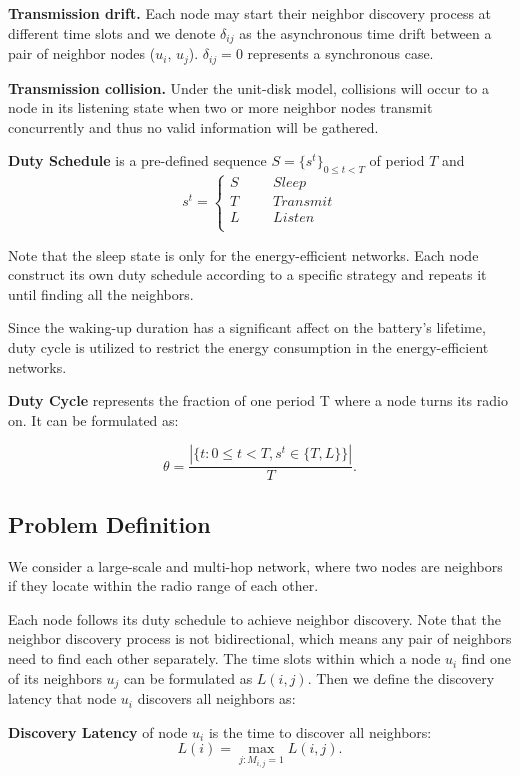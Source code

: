 \textbf{Transmission drift.} 
Each node may start their neighbor discovery process 
at different time slots and we denote $\delta_{ij}$ as the asynchronous time drift
between a pair of neighbor nodes ($u_i$, $u_j$). 
$\delta_{ij} = 0$ represents a synchronous case.
   

\textbf{Transmission collision.} 
Under the unit-disk model, collisions will occur 
to a node in its listening state when two or more neighbor nodes 
transmit concurrently and thus no valid information will be gathered.

\begin{definition}
\textbf{Duty Schedule} is a pre-defined sequence $S=\{s^t\}_{0\leq t<T}$ of period $T$ and
$$ s^t=\left\{
\begin{aligned}
S  & & & {Sleep}  	 \\
T  & & & {Transmit}	\\
L  & & & {Listen}	\\
\end{aligned}
\right.
$$
\end{definition}

Note that the sleep state is only for the energy-efficient networks.
Each node construct its own duty schedule according to a specific strategy and repeats it
until finding all the neighbors. 

Since the waking-up duration has a significant affect on the battery's lifetime, 
duty cycle is utilized to restrict the energy consumption in the energy-efficient networks.

\begin{definition}
\textbf{Duty Cycle} represents the fraction of one period T where a node turns its radio on. It can be formulated as:

$$\theta=\frac{|\{t: 0\leq t<T, s^t \in \{T,L\}\}|}{T}.
$$
\end{definition}  

\subsection{Problem Definition}

We consider a large-scale and multi-hop network, 
where two nodes are neighbors if they locate within the radio range of each other. 

Each node follows its duty schedule to achieve neighbor discovery. 
Note that the neighbor discovery process is not bidirectional, which means any pair of neighbors 
need to find each other separately. The time slots within which a node $u_i$ find one of its neighbors $u_j$ can be formulated 
as $L(i,j)$. Then we define the discovery latency that node $u_i$ discovers all neighbors as:
\begin{definition}
\textbf{Discovery Latency} of node $u_i$ is the time to discover all neighbors:
$$L(i) = \max_{j:M_{i,j}=1} L(i,j).
$$
\end{definition}

